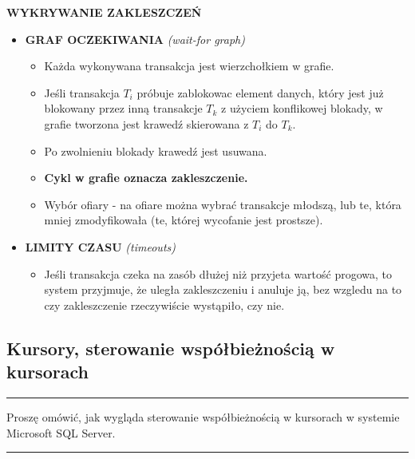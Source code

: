 \documentclass[a5paper,6pt]{article}
\newcommand{\horrule}[1]{\rule{\linewidth}{#1}}
\begin{document}
    \textbf{WYKRYWANIE ZAKLESZCZEŃ}
    \begin{itemize}
        \item \textbf{GRAF OCZEKIWANIA} \textit{(wait-for graph)}
        \begin{itemize}
            \item Każda wykonywana transakcja jest wierzchołkiem w grafie.
            \item Jeśli transakcja $T_i$ próbuje zablokowac element danych,
                  który jest już blokowany przez inną transakcje $T_k$ z użyciem
                  konflikowej blokady, w grafie tworzona jest krawedź skierowana
                  z $T_i$ do $T_k$.
            \item Po zwolnieniu blokady krawedź jest usuwana.
            \item \textbf{Cykl w grafie oznacza zakleszczenie.}
            \item Wybór ofiary - na ofiare można wybrać transakcje młodszą, lub
                  te, która mniej zmodyfikowała (te, której wycofanie jest
                  prostsze).
        \end{itemize}

        \item \textbf{LIMITY CZASU} \textit{(timeouts)}
        \begin{itemize}
            \item Jeśli transakcja czeka na zasób dłużej niż przyjeta wartość
                  progowa, to system przyjmuje, że uległa zakleszczeniu i
                  anuluje ją, bez wzgledu na to czy zakleszczenie rzeczywiście
                  wystąpiło, czy nie.
        \end{itemize}
    \end{itemize}

    \subsection{Kursory, sterowanie współbieżnością w kursorach} %
    \label{sub:kursory_sterowanie_wspolbieznoscia_w_kursorach}

    \horrule{0.5pt}
    Proszę omówić, jak wygląda sterowanie współbieżnością w kursorach w systemie
    Microsoft SQL Server.\\
    \horrule{0.5pt}
\end{document}
